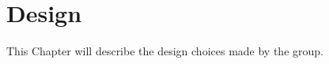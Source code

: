 \chapter{Design}
\label{design}
This Chapter will describe the design choices made by the group. 



